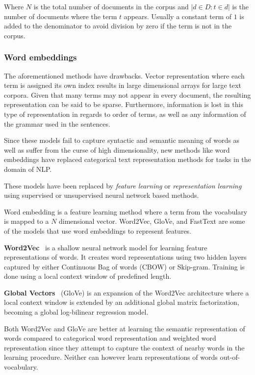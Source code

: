 \documentclass[oneside, english, bibtex]{kththesis}
\begin{document}
Where $N$ is the total number of documents in the corpus and $|d \in D : t \in d|$ is the number of documents where the term $t$ appears. Usually a constant term of $1$ is added to the denominator to avoid division by zero if the term is not in the corpus.

\subsubsection{Word embeddings}

The aforementioned methods have drawbacks. Vector representation where each term is assigned its own index results in large dimensional arrays for large text corpora. Given that many terms may not appear in every document, the resulting representation can be said to be sparse. Furthermore, information is lost in this type of representation in regards to order of terms, as well as any information of the grammar used in the sentences.

Since these models fail to capture syntactic and semantic meaning of words as well as suffer from the curse of high dimensionality, new methods like word embeddings have replaced categorical text representation methods for tasks in the domain of NLP.

These models have been replaced by \textit{feature learning} or \textit{representation learning} using supervised or unsupervised neural network based methods.

Word embedding is a feature learning method where a term from the vocabulary is mapped to a $N$ dimensional vector. Word2Vec, GloVe, and FastText are some of the models that use word embeddings to represent features.

\textbf{Word2Vec}~\cite{mikolov2013} is a shallow neural network model for learning feature representations of words. It creates word representations using two hidden layers captured by either Continuous Bag of words (CBOW) or Skip-gram. Training is done using a local context window of predefined length. 

\textbf{Global Vectors}~\cite{pennington2014glove} (GloVe) is an expansion of the Word2Vec architecture where a local context window is extended by an additional global matrix factorization, becoming a global log-bilinear regression model.

Both Word2Vec and GloVe are better at learning the semantic representation of words compared to categorical word representation and weighted word representation since they attempt to capture the context of nearby words in the learning procedure. Neither can however learn representations of words out-of-vocabulary. 
\end{document}
